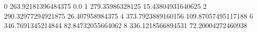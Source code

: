 0 263.92181396484375 0.0
1 279.35986328125 15.43804931640625
2 290.32977294921875 26.407958984375
4 373.7923889160156 109.87057495117188
6 346.7691345214844 82.84732055664062
8 336.1218566894531 72.20004272460938
